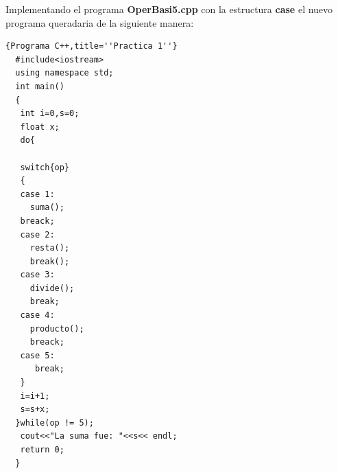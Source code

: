 \documentclass[a4paper,12pt,spanish]{article}
\newcommand\mylstcaption{}
\begin{document}
\newpage
    Implementando el programa \textbf{OperBasi5.cpp} con la estructura \textbf{case} el nuevo programa queradaria de la siguiente manera:

    \renewcommand\mylstcaption{\textbf{OperBAsi6.cpp}}

\begin{lstlisting}[frame=trBL,caption=\mylstcaption]{Programa C++,title=''Practica 1''}
  #include<iostream>
  using namespace std;
  int main()
  {
   int i=0,s=0;
   float x;
   do{

   switch{op}
   {
   case 1:
     suma(); 
   breack;
   case 2:
     resta();
     break();
   case 3:
     divide();
     break;
   case 4:
     producto();
     breack;
   case 5:
      break;
   }
   i=i+1;
   s=s+x;
  }while(op != 5);
   cout<<"La suma fue: "<<s<< endl;
   return 0;
  }
\end{lstlisting}
\vfill
\end{document}
